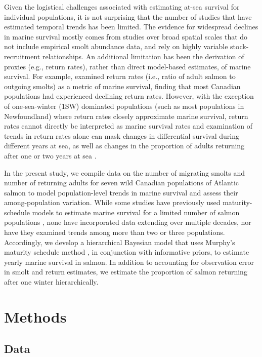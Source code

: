 \documentclass[12pt]{article}
\begin{document}

Given the logistical challenges associated with estimating at-sea survival for
individual populations, it is not surprising that the number of studies that
have estimated temporal trends has been limited.
The evidence for widespread declines in marine survival mostly comes from studies
over broad spatial scales that do not include empirical smolt abundance data, and
rely on highly variable stock-recruitment relationships.
An additional limitation has been the derivation of
proxies (e.g., return rates), rather than direct model-based estimates, of
marine survival.
For example, \citet{Chaput2012a} examined return rates (i.e., ratio of adult salmon to outgoing smolts)
as a metric of marine survival, finding that most Canadian populations
had experienced declining return rates.
However, with the exception of one-sea-winter (1SW) dominated populations
(such as most populations in Newfoundland) where return rates
closely approximate marine survival, return rates cannot directly be interpreted as marine survival rates and
examination of trends in return rates alone can mask changes in
differential survival during different years at sea, as well as changes in the
proportion of adults returning after one or two years at sea \citep{Hubley2011}.

In the present study, we compile data on the number of migrating smolts and number of returning adults
for seven wild Canadian populations of Atlantic salmon to model population-level trends in marine survival
and assess their among-population variation.
While some studies have previously used maturity-schedule models to estimate marine
survival for a limited number of salmon populations \citep{Chaput2003b,Hubley2011}, none
have incorporated data extending over multiple decades, nor have they examined
trends among more than two or three populations.
Accordingly, we develop a hierarchical Bayesian model that uses Murphy's maturity
schedule method \citep{Murphy1952}, in conjunction with informative priors, to estimate yearly
marine survival in salmon. In addition to accounting for observation error in
smolt and return estimates, we estimate the proportion of salmon returning
after one winter hierarchically.

\section*{Methods}

\subsection*{Data}
\end{document}
